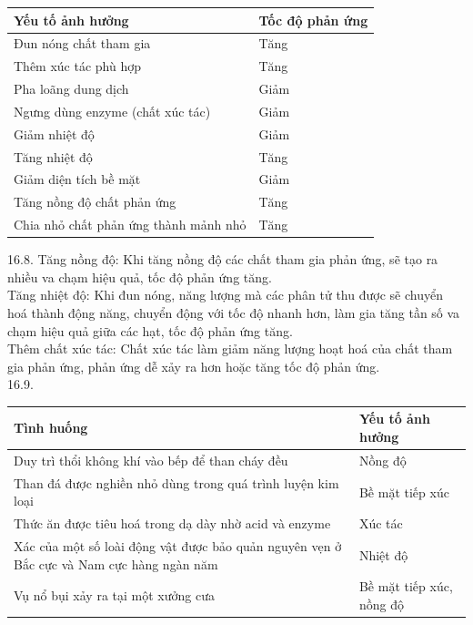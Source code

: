 \documentclass[10pt]{article}
\begin{document}
\begin{center}
\begin{tabular}{|l|l|}
\hline
Yếu tố ảnh hưởng & Tốc độ phản ứng \\
\hline
Đun nóng chất tham gia & Tăng \\
\hline
Thêm xúc tác phù hợp & Tăng \\
\hline
Pha loãng dung dịch & Giảm \\
\hline
Ngưng dùng enzyme (chất xúc tác) & Giảm \\
\hline
Giảm nhiệt độ & Giảm \\
\hline
Tăng nhiệt độ & Tăng \\
\hline
Giảm diện tích bề mặt & Giảm \\
\hline
Tăng nồng độ chất phản ứng & Tăng \\
\hline
Chia nhỏ chất phản ứng thành mảnh nhỏ & Tăng \\
\hline
\end{tabular}
\end{center}

16.8. Tăng nồng độ: Khi tăng nồng độ các chất tham gia phản ứng, sẽ tạo ra nhiều va chạm hiệu quả, tốc độ phản ứng tăng.\\
Tăng nhiệt độ: Khi đun nóng, năng lượng mà các phân tử thu được sẽ chuyển hoá thành động năng, chuyển động với tốc độ nhanh hơn, làm gia tăng tần số va chạm hiệu quả giữa các hạt, tốc độ phản ứng tăng.\\
Thêm chất xúc tác: Chất xúc tác làm giảm năng lượng hoạt hoá của chất tham gia phản ứng, phản ứng dễ xảy ra hơn hoặc tăng tốc độ phản ứng.\\
16.9.

\begin{center}
\begin{tabular}{|l|l|}
\hline
Tình huống & Yếu tố ảnh hưởng \\
\hline
Duy trì thổi không khí vào bếp để than cháy đều & Nồng độ \\
\hline
Than đá được nghiền nhỏ dùng trong quá trình luyện kim loại & Bề mặt tiếp xúc \\
\hline
Thức ăn được tiêu hoá trong dạ dày nhờ acid và enzyme & Xúc tác \\
\hline
Xác của một số loài động vật được bảo quản nguyên vẹn ở Bắc cực và Nam cực hàng ngàn năm & Nhiệt độ \\
\hline
Vụ nổ bụi xảy ra tại một xưởng cưa & Bề mặt tiếp xúc, nồng độ \\
\hline
\end{tabular}
\end{center}
\end{document}
